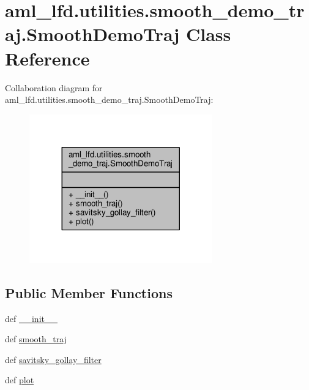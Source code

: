 \hypertarget{classaml__lfd_1_1utilities_1_1smooth__demo__traj_1_1_smooth_demo_traj}{\section{aml\-\_\-lfd.\-utilities.\-smooth\-\_\-demo\-\_\-traj.\-Smooth\-Demo\-Traj Class Reference}
\label{classaml__lfd_1_1utilities_1_1smooth__demo__traj_1_1_smooth_demo_traj}
}


Collaboration diagram for aml\-\_\-lfd.\-utilities.\-smooth\-\_\-demo\-\_\-traj.\-Smooth\-Demo\-Traj\-:\nopagebreak
\begin{figure}[H]
\begin{center}
\leavevmode
\includegraphics[width=224pt]{classaml__lfd_1_1utilities_1_1smooth__demo__traj_1_1_smooth_demo_traj__coll__graph}
\end{center}
\end{figure}
\subsection*{Public Member Functions}
\begin{DoxyCompactItemize}
\item 
def \hyperlink{classaml__lfd_1_1utilities_1_1smooth__demo__traj_1_1_smooth_demo_traj_ac035d625248a7ff7c5302aa8e14dcf14}{\-\_\-\-\_\-init\-\_\-\-\_\-}
\item 
def \hyperlink{classaml__lfd_1_1utilities_1_1smooth__demo__traj_1_1_smooth_demo_traj_a78ea2232742f7212da780558d0fcbd34}{smooth\-\_\-traj}
\item 
def \hyperlink{classaml__lfd_1_1utilities_1_1smooth__demo__traj_1_1_smooth_demo_traj_acaea984a5c0e4f5a41778c27936b71c9}{savitsky\-\_\-gollay\-\_\-filter}
\item 
def \hyperlink{classaml__lfd_1_1utilities_1_1smooth__demo__traj_1_1_smooth_demo_traj_a8bf09e8534a24fa61716a95fd07651ba}{plot}
\end{DoxyCompactItemize}


